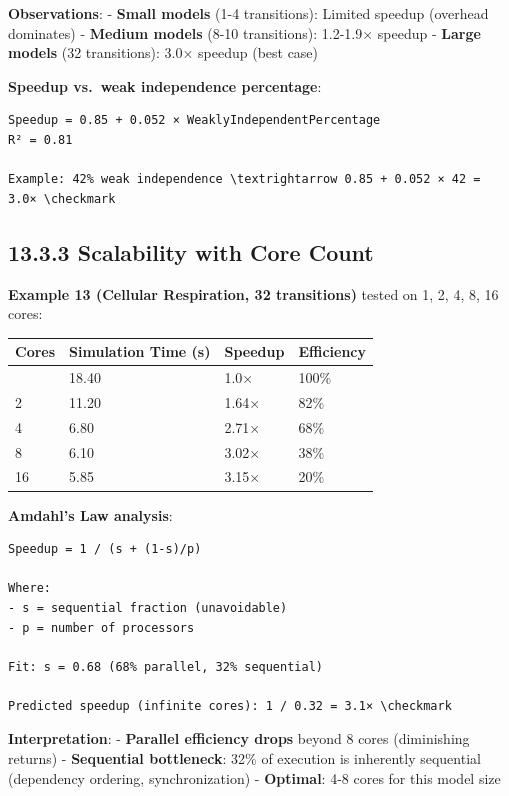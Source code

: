\textbf{Observations}: - \textbf{Small models} (1-4 transitions):
Limited speedup (overhead dominates) - \textbf{Medium models} (8-10
transitions): 1.2-1.9× speedup - \textbf{Large models} (32 transitions):
3.0× speedup (best case)

\textbf{Speedup vs.~weak independence percentage}:

\begin{lstlisting}
Speedup = 0.85 + 0.052 × WeaklyIndependentPercentage
R² = 0.81

Example: 42% weak independence \textrightarrow 0.85 + 0.052 × 42 = 3.0× \checkmark
\end{lstlisting}

\hypertarget{scalability-with-core-count}{%
\subsection{13.3.3 Scalability with Core
Count}\label{scalability-with-core-count}}

\textbf{Example 13 (Cellular Respiration, 32 transitions)} tested on 1,
2, 4, 8, 16 cores:

\begin{longtable}[]{@{}llll@{}}
\toprule\noalign{}
Cores & Simulation Time (s) & Speedup & Efficiency \\
\midrule\noalign{}
\endhead
\bottomrule\noalign{}
\endlastfoot
1 & 18.40 & 1.0× & 100\% \\
2 & 11.20 & 1.64× & 82\% \\
4 & 6.80 & 2.71× & 68\% \\
8 & 6.10 & 3.02× & 38\% \\
16 & 5.85 & 3.15× & 20\% \\
\end{longtable}

\textbf{Amdahl's Law analysis}:

\begin{lstlisting}
Speedup = 1 / (s + (1-s)/p)

Where:
- s = sequential fraction (unavoidable)
- p = number of processors

Fit: s = 0.68 (68% parallel, 32% sequential)

Predicted speedup (infinite cores): 1 / 0.32 = 3.1× \checkmark
\end{lstlisting}

\textbf{Interpretation}: - \textbf{Parallel efficiency drops} beyond 8
cores (diminishing returns) - \textbf{Sequential bottleneck}: 32\% of
execution is inherently sequential (dependency ordering,
synchronization) - \textbf{Optimal}: 4-8 cores for this model size


